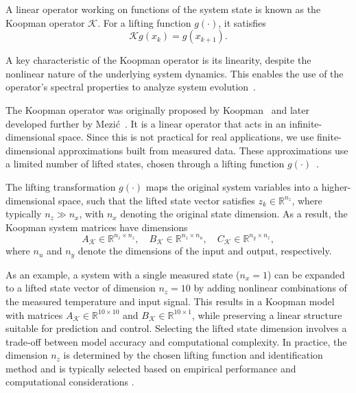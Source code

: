A linear operator working on functions of the system state is known as the Koopman operator $\mathcal{K}$.
For a lifting function $g(\cdot)$, it satisfies
\begin{equation}
\mathcal{K} g(x_k) = g(x_{k+1}).
\end{equation}

A key characteristic of the Koopman operator is its linearity, despite the nonlinear nature of the underlying system dynamics. This enables the use of the operator's spectral properties to analyze system evolution \cite{mauroy2020koopman}.


The Koopman operator was originally proposed by Koopman \cite{koopman1931} and later developed further by Mezi\'c \cite{mezic2005}. It is a linear operator that acts in an infinite-dimensional space. Since this is not practical for real applications, we use finite-dimensional approximations built from measured data. These approximations use a limited number of lifted states, chosen through a lifting function $g(\cdot)$ \cite{mauroy2020koopman}.

The lifting transformation $g(\cdot)$ maps the original system variables into a higher-dimensional space, such that the lifted state vector satisfies $z_k \in \mathbb{R}^{n_z}$, where typically $n_z \gg n_x$, with $n_x$ denoting the original state dimension.
As a result, the Koopman system matrices have dimensions
\begin{equation}
A_{\mathcal{K}} \in \mathbb{R}^{n_z \times n_z}, \quad
B_{\mathcal{K}} \in \mathbb{R}^{n_z \times n_u}, \quad
C_{\mathcal{K}} \in \mathbb{R}^{n_y \times n_z},
\end{equation}
where $n_u$ and $n_y$ denote the dimensions of the input and output, respectively.

As an example, a system with a single measured state ($n_x = 1$) can be expanded to a lifted state vector of dimension $n_z = 10$ by adding nonlinear combinations of the measured temperature and input signal. This results in a Koopman model with matrices $A_{\mathcal{K}} \in \mathbb{R}^{10 \times 10}$ and $B_{\mathcal{K}} \in \mathbb{R}^{10 \times 1}$, while preserving a linear structure suitable for prediction and control.
Selecting the lifted state dimension involves a trade-off between model accuracy and computational complexity. In practice, the dimension $n_z$ is determined by the chosen lifting function and identification method and is typically selected based on empirical performance and computational considerations \cite{korda2018}.

